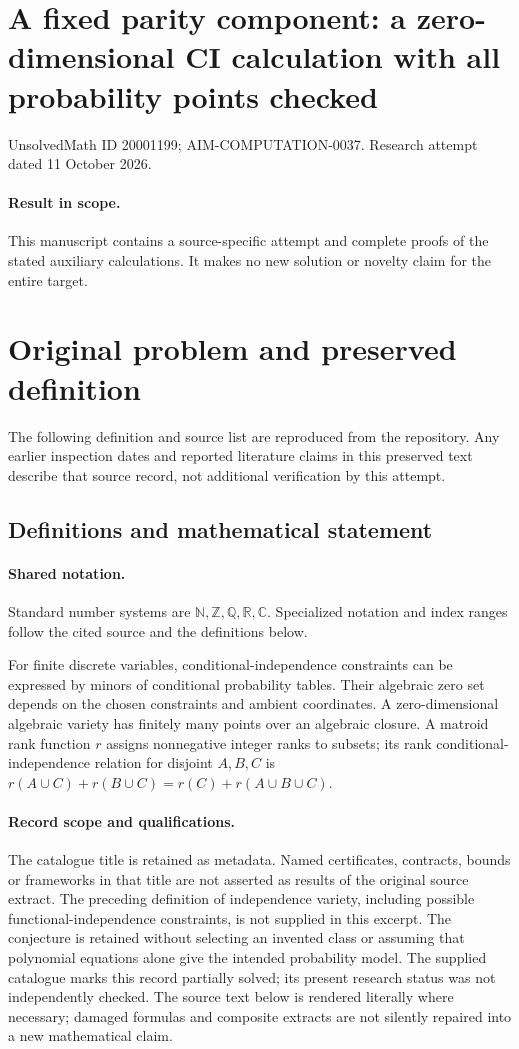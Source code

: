 \documentclass[11pt]{article}
\begin{document}
\section*{A fixed parity component: a zero-dimensional CI calculation with all probability points checked}
\noindent UnsolvedMath ID 20001199; AIM-COMPUTATION-0037. Research attempt dated 11 October 2026.
\paragraph{Result in scope.}This manuscript contains a source-specific attempt and complete proofs of the stated auxiliary calculations. It makes no new solution or novelty claim for the entire target.
\section{Original problem and preserved definition}
The following definition and source list are reproduced from the repository. Any earlier inspection dates and reported literature claims in this preserved text describe that source record, not additional verification by this attempt.
\subsection{Definitions and mathematical statement}

\paragraph{Shared notation.}Standard number systems are $\mathbb N,\mathbb Z,\mathbb Q,\mathbb R,\mathbb C$. Specialized notation and index ranges follow the cited source and the definitions below.


For finite discrete variables, conditional-independence constraints can be expressed by minors of conditional probability tables. Their algebraic zero set depends on the chosen constraints and ambient coordinates. A zero-dimensional algebraic variety has finitely many points over an algebraic closure. A matroid rank function $r$ assigns nonnegative integer ranks to subsets; its rank conditional-independence relation for disjoint $A,B,C$ is $r(A\cup C)+r(B\cup C)=r(C)+r(A\cup B\cup C)$.
\paragraph{Record scope and qualifications.}
The catalogue title is retained as metadata. Named certificates, contracts, bounds or frameworks in that title are not asserted as results of the original source extract.
The preceding definition of independence variety, including possible functional-independence constraints, is not supplied in this excerpt. The conjecture is retained without selecting an invented class or assuming that polynomial equations alone give the intended probability model. The supplied catalogue marks this record partially solved; its present research status was not independently checked.
The source text below is rendered literally where necessary; damaged formulas and composite extracts are not silently repaired into a new mathematical claim.
\end{document}
